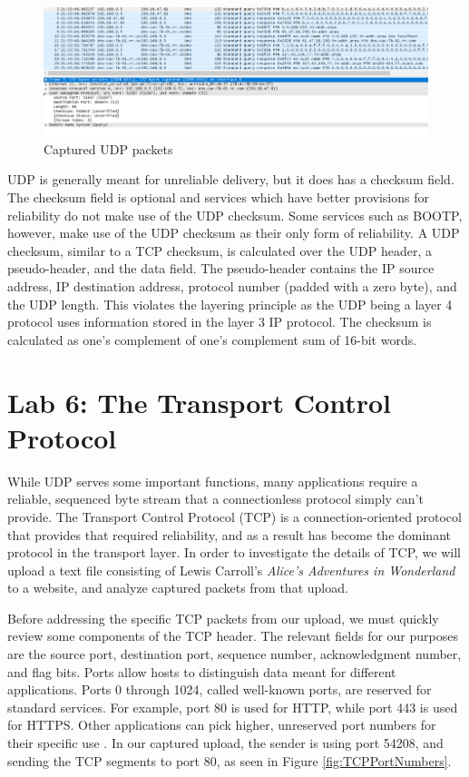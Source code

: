 \documentclass[10pt]{IEEEtran}
\begin{document}
\begin{figure}[h!]
	\includegraphics[width=\linewidth]{udpCapture.png}
	\caption{Captured UDP packets}
	\label{fig:udpCapture}
\end{figure}

 UDP is generally meant for unreliable delivery, but it does has a checksum field. The checksum field is optional and services which have better provisions for reliability do not make use of the UDP checksum. Some services such as BOOTP, however, make use of the UDP checksum as their only form of reliability. A UDP checksum, similar to a TCP checksum, is calculated over the UDP header, a pseudo-header, and the data field. The pseudo-header contains the IP source address, IP destination address, protocol number (padded with a zero byte), and the UDP length. This violates the layering principle as the UDP being a layer 4 protocol uses information stored in the layer 3 IP protocol. The checksum is calculated as one's complement of one's complement sum of 16-bit words. \\
 
\section{Lab 6: The Transport Control Protocol}

 While UDP serves some important functions, many applications require a reliable, sequenced byte stream that a connectionless protocol simply can't provide. The Transport Control Protocol (TCP) is a connection-oriented protocol that provides that required reliability, and as a result has become the dominant protocol in the transport layer. In order to investigate the details of TCP, we will upload a text file consisting of Lewis Carroll's \textit{Alice's Adventures in Wonderland} to a website, and analyze captured packets from that upload.
 
 Before addressing the specific TCP packets from our upload, we must quickly review some components of the TCP header. The relevant fields for our purposes are the source port, destination port, sequence number, acknowledgment number, and flag bits. Ports allow hosts to distinguish data meant for different applications. Ports 0 through 1024, called well-known ports, are reserved for standard services. For example, port 80 is used for HTTP, while port 443 is used for HTTPS. Other applications can pick higher, unreserved port numbers for their specific use \cite{tanenbaum}. In our captured upload, the sender is using port 54208, and sending the TCP segments to port 80, as seen in Figure \ref{fig:TCPPortNumbers}.\\
 
\end{document}
